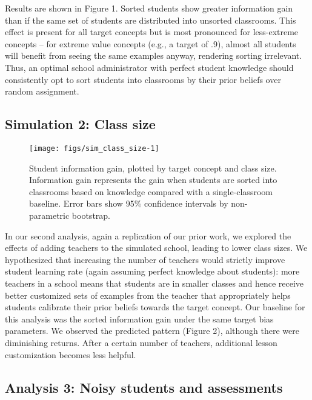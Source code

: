 \documentclass[man]{apa6}
\newenvironment{CodeChunk}{}{}
\begin{document}
Results are shown in Figure 1. Sorted students show greater information
gain than if the same set of students are distributed into unsorted
classrooms. This effect is present for all target concepts but is most
pronounced for less-extreme concepts -- for extreme value concepts
(e.g., a target of .9), almost all students will benefit from seeing the
same examples anyway, rendering sorting irrelevant. Thus, an optimal
school administrator with perfect student knowledge should consistently
opt to sort students into classrooms by their prior beliefs over random
assignment.

\subsection{Simulation 2: Class size}\label{simulation-2-class-size}

\begin{CodeChunk}
\begin{figure}[t]
\texttt{[image: figs/sim\_class\_size-1]} \caption[Student information gain, plotted by target concept and class size]{Student information gain, plotted by target concept and class size. Information gain represents the gain when students are sorted into classrooms based on knowledge compared with a single-classroom baseline. Error bars show 95\% confidence intervals by non-parametric bootstrap.}\label{fig:sim_class_size}
\end{figure}
\end{CodeChunk}

In our second analysis, again a replication of our prior work, we
explored the effects of adding teachers to the simulated school, leading
to lower class sizes. We hypothesized that increasing the number of
teachers would strictly improve student learning rate (again assuming
perfect knowledge about students): more teachers in a school means that
students are in smaller classes and hence receive better customized sets
of examples from the teacher that appropriately helps students calibrate
their prior beliefs towards the target concept. Our baseline for this
analysis was the sorted information gain under the same target bias
parameters. We observed the predicted pattern (Figure 2), although there
were diminishing returns. After a certain number of teachers, additional
lesson customization becomes less helpful.

\subsection{Analysis 3: Noisy students and
assessments}\label{analysis-3-noisy-students-and-assessments}
\end{document}
